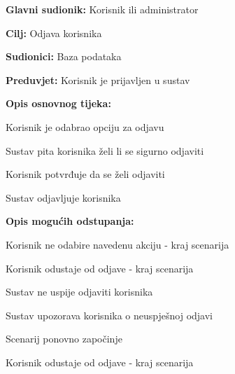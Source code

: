 					\noindent {}
					\begin{packed_item}
	
						\item \textbf{Glavni sudionik: }Korisnik ili administrator
						\item  \textbf{Cilj:} Odjava korisnika
						\item  \textbf{Sudionici:} Baza podataka
						\item  \textbf{Preduvjet:} Korisnik je prijavljen u sustav
						\item  \textbf{Opis osnovnog tijeka:}
						
						\item[] \begin{packed_enum}
							\item Korisnik je odabrao opciju za odjavu
							\item Sustav pita korisnika želi li se sigurno odjaviti
							\item Korisnik potvrđuje da se želi odjaviti
							\item Sustav odjavljuje korisnika
						\end{packed_enum}

						\item  \textbf{Opis mogućih odstupanja:}

						\item[] \begin{packed_item}
							\item[1.a] Korisnik ne odabire navedenu akciju - kraj scenarija
							\item[3.a] Korisnik odustaje od odjave - kraj scenarija
							\item[4.a] Sustav ne uspije odjaviti korisnika
							\item[] \begin{packed_enum}
								\item Sustav upozorava korisnika o neuspješnoj odjavi 
								\item
									\begin{packed_enum}
										\item Scenarij ponovno započinje
										\item Korisnik odustaje od odjave - kraj scenarija
									\end{packed_enum}
							\end{packed_enum}						
						\end{packed_item}
					\end{packed_item}

